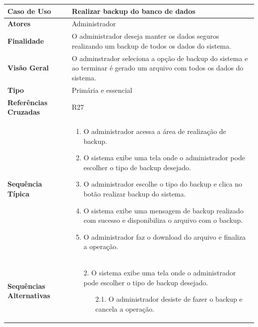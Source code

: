 \documentclass[a4paper,11pt]{article}
\begin{document}
\begin{table}[H]
		\begin{tabularx}{\textwidth}{|l|X|}
		\hline
			\textbf{Caso de Uso} &  Realizar backup do banco de dados \\ \hline
			\textbf{Atores} &  Administrador  \\ \hline
			\textbf{Finalidade} &  O administrador deseja manter os dados seguros realizando um backup de todos os dados do sistema. \\ \hline
			\textbf{Visão Geral} & O adminstrador seleciona a opção de backup do sistema e ao terminar é gerado um arquivo com todos os dados do sistema. \\ \hline
			\textbf{Tipo} & Primária e essencial \\ \hline
			\textbf{Referências Cruzadas} &  R27 \\ \hline
			\textbf{Sequência Típica} & 
			\begin{enumerate}
			\item O administrador acessa a área de realização de backup.
			\item O sistema exibe uma tela onde o administrador pode escolher o tipo de backup desejado.	
			\item O administrador escolhe o tipo do backup e clica no botão realizar backup do sistema.
			\item O sistema exibe uma mensagem de backup realizado com sucesso e disponibiliza o arquivo com o backup.
			\item O administrador faz o download do arquivo e finaliza a operação.
			\end{enumerate} \\ \hline
			
			\textbf{Sequências Alternativas} & 
			\begin{itemize}
				\item[2.] O sistema exibe uma tela onde o administrador pode escolher o tipo de backup desejado.
				\begin{itemize}
					\item[2.1.] O administrador desiste de fazer o backup e cancela a operação.
				\end{itemize}
			\end{itemize} \\ \hline
		\end{tabularx}
\end{table}
\end{document}
